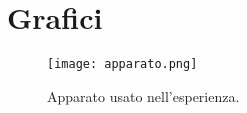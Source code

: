 \section{Grafici}

\begin{figure}[h]
	\centering
	\texttt{[image: apparato.png]}
	\caption{Apparato usato nell'esperienza.}
	\label{f:apparato}
\end{figure}





